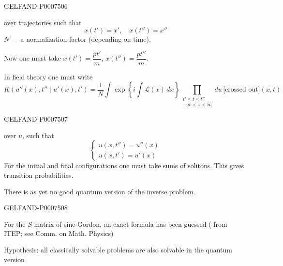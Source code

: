 \begin{GelfandAdjacentEvidence}{GELFAND-P000750}{6}

over trajectories such that
\begin{equation*}
x(t')=x',\quad x(t'')=x''
\tag{35}
\end{equation*}
\(N\) --- a normalization factor (depending on time).

Now one must take \(x(t')=\dfrac{pt'}m\), \(x(t'')=\dfrac{pt''}m\).

In field theory one must write
\begin{equation*}
K(u''(x),t''\mid u'(x),t')=\frac1N\int
\exp\left\{i\int\mathcal L(x)\,dx\right\}
\prod_{\substack{t'\leq t\leq t''\\-\infty<x<\infty}}
du\,\text{[crossed out]}(x,t)
\tag{36}
\end{equation*}
\end{GelfandAdjacentEvidence}
\begin{GelfandAdjacentEvidence}{GELFAND-P000750}{7}

over \(u\), such that
\begin{equation*}
\begin{cases}
u(x,t'')=u''(x)\\
u(x,t')=u'(x)
\end{cases}
\tag{37}
\end{equation*}
For the initial and final configurations one must take sums of solitons. This gives transition probabilities.

There is as yet no good quantum version of the inverse problem.
\end{GelfandAdjacentEvidence}
\begin{GelfandAdjacentEvidence}{GELFAND-P000750}{8}


For the \(S\)-matrix of sine-Gordon, an exact formula has been guessed
( from ITEP; see Comm. on Math. Physics)

\end{GelfandAdjacentEvidence}

Hypothesis: all classically solvable problems are also solvable in the quantum version


